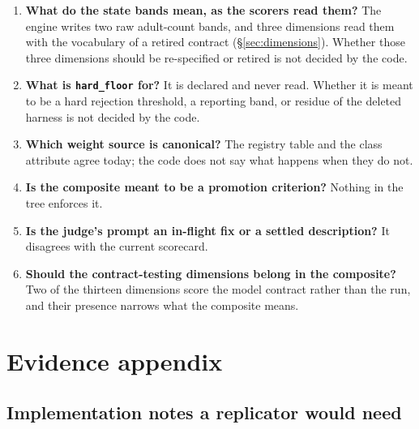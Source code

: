\documentclass[11pt,a4paper]{article}
\newcommand{\code}[1]{\texttt{#1}}
\begin{document}
\begin{enumerate}
\item \textbf{What do the state bands mean, as the scorers read them?} The
      engine writes two raw adult-count bands, and three dimensions read
      them with the vocabulary of a retired contract
      (\S\ref{sec:dimensions}). Whether those three dimensions should be
      re-specified or retired is not decided by the code.
\item \textbf{What is \code{hard\_floor} for?} It is declared and never read.
      Whether it is meant to be a hard rejection threshold, a reporting band,
      or residue of the deleted harness is not decided by the code.
\item \textbf{Which weight source is canonical?} The registry table and the
      class attribute agree today; the code does not say what happens when
      they do not.
\item \textbf{Is the composite meant to be a promotion criterion?} Nothing in
      the tree enforces it.
\item \textbf{Is the judge's prompt an in-flight fix or a settled
      description?} It disagrees with the current scorecard.
\item \textbf{Should the contract-testing dimensions belong in the
      composite?} Two of the thirteen dimensions score the model contract
      rather than the run, and their presence narrows what the composite
      means.
\end{enumerate}

\section{Evidence appendix}

\subsection{Implementation notes a replicator would need}
\end{document}
